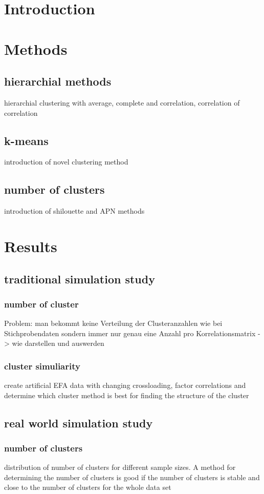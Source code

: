   \chapter{Introduction}
   \chapter{Methods}
   \section{hierarchial methods}
   hierarchial clustering with average, complete and correlation, correlation of correlation
   \section{k-means}
   introduction of novel clustering method
   \section{number of clusters}
   introduction of shilouette and APN methods
   \chapter{Results}
   \section{traditional simulation study}
   \subsection{number of cluster}
   Problem: man bekommt keine Verteilung der Clusteranzahlen wie bei Stichprobendaten sondern immer nur genau eine Anzahl pro Korrelationsmatrix -> wie darstellen und auswerden
   \subsection{cluster simuliarity}
   create artificial EFA data with changing crossloading, factor correlations and determine which 
   cluster method is best for finding the structure of the cluster
   \section{real world simulation study}
   \subsection{number of clusters}
   distribution of number of clusters for different sample sizes. A method for determining the number of clusters is good if the number of clusters is stable and close to the number of clusters for the whole data set 
